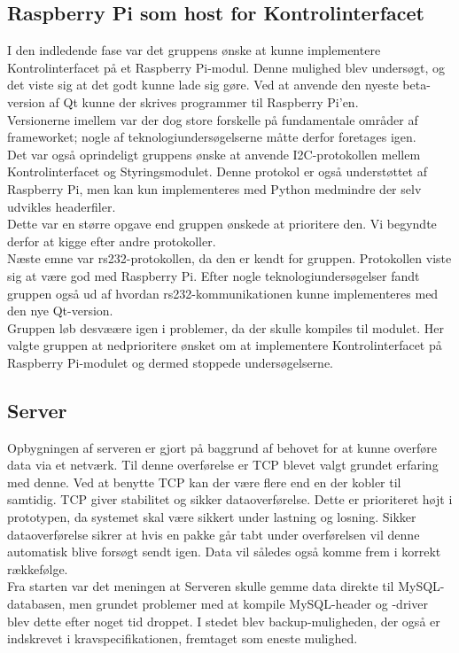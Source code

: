 
\subsection{Raspberry Pi som host for Kontrolinterfacet}
I den indledende fase var det gruppens ønske at kunne implementere Kontrolinterfacet på et Raspberry Pi-modul. Denne mulighed blev undersøgt, og det viste sig at det godt kunne lade sig gøre. Ved at anvende den nyeste beta-version af Qt kunne der skrives programmer til Raspberry Pi'en.\\
Versionerne imellem var der dog store forskelle på fundamentale områder af frameworket; nogle af teknologiundersøgelserne måtte derfor foretages igen.\\
Det var også oprindeligt gruppens ønske at anvende I2C-protokollen mellem Kontrolinterfacet og Styringsmodulet. Denne protokol er også understøttet af Raspberry Pi, men kan kun implementeres med Python medmindre der selv udvikles headerfiler.\\
Dette var en større opgave end gruppen ønskede at prioritere den. Vi begyndte derfor at kigge efter andre protokoller.\\
Næste emne var rs232-protokollen, da den er kendt for gruppen. Protokollen viste sig at være god med Raspberry Pi. Efter nogle teknologiundersøgelser fandt gruppen også ud af hvordan rs232-kommunikationen kunne implementeres med den nye Qt-version.\\
Gruppen løb desvæære igen i problemer, da der skulle kompiles til modulet. Her valgte gruppen at nedprioritere ønsket om at implementere Kontrolinterfacet på Raspberry Pi-modulet og dermed stoppede undersøgelserne.

\subsection{Server}
Opbygningen af serveren er gjort på baggrund af behovet for at kunne overføre data via et netværk. Til denne overførelse er TCP blevet valgt grundet erfaring med denne. Ved at benytte TCP kan der være flere end en der kobler til samtidig. TCP giver stabilitet og sikker dataoverførelse. Dette er prioriteret højt i prototypen, da systemet skal være sikkert under lastning og losning. Sikker dataoverførelse sikrer at hvis en pakke går tabt under overførelsen vil denne automatisk blive forsøgt sendt igen. Data vil således også komme frem i korrekt rækkefølge.\\
Fra starten var det meningen at Serveren skulle gemme data direkte til MySQL-databasen, men grundet problemer med at kompile MySQL-header og -driver blev dette efter noget tid droppet. I stedet blev backup-muligheden, der også er indskrevet i kravspecifikationen, fremtaget som eneste mulighed.

